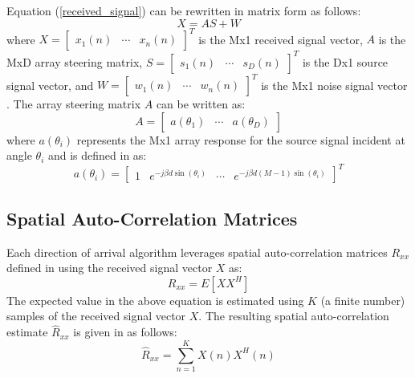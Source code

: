 \documentclass[conference]{IEEEtran}
\begin{document}
	Equation (\ref{received_signal}) can be rewritten in matrix form as follows:
	\begin{equation}
		X = AS + W
	\end{equation}
	where $X = \begin{bmatrix} x_1(n) & \cdots & x_n(n)\end{bmatrix}^T$ is the Mx1 received signal vector, $A$ is the MxD array steering matrix, $S = \begin{bmatrix} s_1(n) & \cdots & s_D(n)\end{bmatrix}^T$ is the Dx1 source signal vector, and $W = \begin{bmatrix} w_1(n) & \cdots & w_n(n)\end{bmatrix}^T$ is the Mx1 noise signal vector \cite{doa_algorithms_raghu}. The array steering matrix $A$ can be written as:
	\begin{equation}
		A = \begin{bmatrix} a(\theta_1) & \cdots & a(\theta_D) \end{bmatrix}
	\end{equation}
	where $a(\theta_i)$ represents the Mx1 array response for the source signal incident at angle $\theta_i$ and is defined in \cite{doa_algorithms_raghu} as:
	\begin{equation}
		\label{array_response_vector}
	 	a(\theta_i) = \begin{bmatrix} 1 & e^{-j{\beta}d\sin(\theta_i)} & \cdots & e^{-j{\beta}d(M-1)\sin(\theta_i)}\end{bmatrix}^T
	\end{equation}
	
	\subsection{Spatial Auto-Correlation Matrices}
	
	Each direction of arrival algorithm leverages spatial auto-correlation matrices $R_{xx}$ defined in \cite{doa_algorithms_raghu}  using the received signal vector $X$ as:
	\begin{equation}
		R_{xx} = E[XX^H]
	\end{equation}
	The expected value in the above equation is estimated using $K$ (a finite number) samples of the received signal vector $X$. The resulting spatial auto-correlation estimate $\hat{R}_{xx}$ is given in \cite{doa_algorithms_raghu} as follows: 
	\begin{equation}
		\label{spatial_matrix_estimate}
		\hat{R}_{xx} = \sum_{n=1}^{K}{X(n)X^H(n)}
	\end{equation}
	
\end{document}
